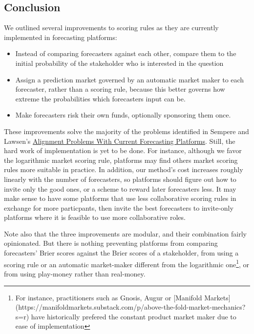 \documentclass[]{article}
\providecommand{\tightlist}{%
  \setlength{\itemsep}{0pt}\setlength{\parskip}{0pt}}
\begin{document}
\hypertarget{conclusion}{%
\subsection{Conclusion}\label{conclusion}}

We outlined several improvements to scoring rules as they are currently
implemented in forecasting platforms:

\begin{itemize}
\tightlist
\item
  Instead of comparing forecasters against each other, compare them to
  the initial probability of the stakeholder who is interested in the
  question
\item
  Assign a prediction market governed by an automatic market maker to
  each forecaster, rather than a scoring rule, because this better
  governs how extreme the probabilities which forecasters input can be.
\item
  Make forecasters risk their own funds, optionally sponsoring them
  once.
\end{itemize}

These improvements solve the majority of the problems identified in
Sempere and Lawsen's \href{https://arxiv.org/abs/2106.11248}{Alignment
Problems With Current Forecasting Platforms}. Still, the hard work of
implementation is yet to be done. For instance, although we favor the
logarithmic market scoring rule, platforms may find others market
scoring rules more suitable in practice. In addition, our method's cost
increases roughly linearly with the number of forecasters, so platforms
should figure out how to invite only the good ones, or a scheme to
reward later forecasters less. It may make sense to have some platforms
that use less collaborative scoring rules in exchange for more
particpants, then invite the best forecasters to invite-only platforms
where it is feasible to use more collaborative roles.

Note also that the three improvements are modular, and their combination
fairly opinionated. But there is nothing preventing platforms from
comparing forecasters' Brier scores against the Brier scores of a
stakeholder, from using a scoring rule or an automatic market-maker
different from the logarithmic
one\footnote{For instance, practitioners such as Gnosis, Augur or [Manifold Markets](https://manifoldmarkets.substack.com/p/above-the-fold-market-mechanics?s=r) have historically prefered the constant product market maker due to ease of implementation},
or from using play-money rather than real-money.
\end{document}
